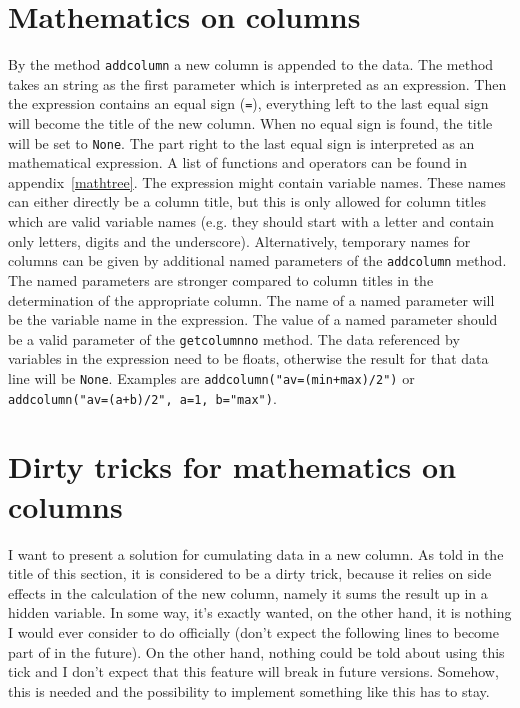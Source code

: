 \section{Mathematics on columns}

By the method \verb|addcolumn| a new column is appended to the data.
The method takes an string as the first parameter which is interpreted
as an expression. Then the expression contains an equal sign
(\verb|=|), everything left to the last equal sign will become the
title of the new column. When no equal sign is found, the title will
be set to \verb|None|. The part right to the last equal sign is
interpreted as an mathematical expression. A list of functions and
operators can be found in appendix~\ref{mathtree}. The expression
might contain variable names. These names can either directly be a
column title, but this is only allowed for column titles which are
valid variable names (e.g. they should start with a letter and contain
only letters, digits and the underscore). Alternatively, temporary
names for columns can be given by additional named parameters of the
\verb|addcolumn| method. The named parameters are stronger compared to
column titles in the determination of the appropriate column. The name
of a named parameter will be the variable name in the expression. The
value of a named parameter should be a valid parameter of the
\verb|getcolumnno| method. The data referenced by variables in the
expression need to be floats, otherwise the result for that data line
will be \verb|None|. Examples are \verb|addcolumn("av=(min+max)/2")|
or \verb|addcolumn("av=(a+b)/2", a=1, b="max")|.

\section{Dirty tricks for mathematics on columns}
\label{datafile:cumulate}

I want to present a solution for cumulating data in a new column.
As told in the title of this section, it is considered to be a dirty
trick, because it relies on side effects in the calculation of the new
column, namely it sums the result up in a hidden variable. In some
way, it's exactly wanted, on the other hand, it is nothing I would
ever consider to do officially (don't expect the following lines to
become part of \PyX{} in the future). On the other hand, nothing could
be told about using this tick and I don't expect that this feature
will break in future versions. Somehow, this is needed and the
possibility to implement something like this has to stay.

